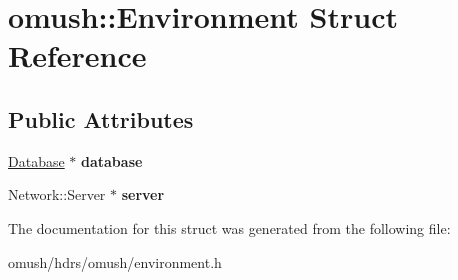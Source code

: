\hypertarget{structomush_1_1_environment}{\section{omush\-:\-:Environment Struct Reference}
\label{structomush_1_1_environment}
}
\subsection*{Public Attributes}
\begin{DoxyCompactItemize}
\item 
\hypertarget{structomush_1_1_environment_add9d6fe61c8be217b0548ecfab64765a}{\hyperlink{classomush_1_1_database}{Database} $\ast$ {\bfseries database}}\label{structomush_1_1_environment_add9d6fe61c8be217b0548ecfab64765a}

\item 
\hypertarget{structomush_1_1_environment_a3559268a2fbc9deb962b3733d6f1fb6a}{Network\-::\-Server $\ast$ {\bfseries server}}\label{structomush_1_1_environment_a3559268a2fbc9deb962b3733d6f1fb6a}

\end{DoxyCompactItemize}


The documentation for this struct was generated from the following file\-:\begin{DoxyCompactItemize}
\item 
omush/hdrs/omush/environment.\-h\end{DoxyCompactItemize}
